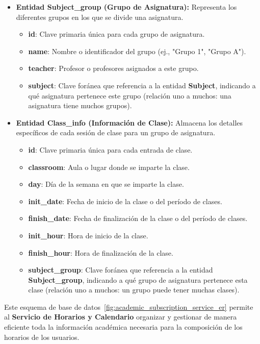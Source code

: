 \begin{itemize}
    \item \textbf{Entidad Subject\_group (Grupo de Asignatura):}
    Representa los diferentes grupos en los que se divide una asignatura.
    \begin{itemize}
        \item \textbf{id}: Clave primaria única para cada grupo de asignatura.
        \item \textbf{name}: Nombre o identificador del grupo (ej., "Grupo 1", "Grupo A").
        \item \textbf{teacher}: Profesor o profesores asignados a este grupo.
        \item \textbf{subject}: Clave foránea que referencia a la entidad \textbf{Subject}, indicando a qué asignatura pertenece este grupo (relación uno a muchos: una asignatura tiene muchos grupos).
    \end{itemize}

    \item \textbf{Entidad Class\_info (Información de Clase):}
    Almacena los detalles específicos de cada sesión de clase para un grupo de asignatura.
    \begin{itemize}
        \item \textbf{id}: Clave primaria única para cada entrada de clase.
        \item \textbf{classroom}: Aula o lugar donde se imparte la clase.
        \item \textbf{day}: Día de la semana en que se imparte la clase.
        \item \textbf{init\_date}: Fecha de inicio de la clase o del período de clases.
        \item \textbf{finish\_date}: Fecha de finalización de la clase o del período de clases.
        \item \textbf{init\_hour}: Hora de inicio de la clase.
        \item \textbf{finish\_hour}: Hora de finalización de la clase.
        \item \textbf{subject\_group}: Clave foránea que referencia a la entidad \textbf{Subject\_group}, indicando a qué grupo de asignatura pertenece esta clase (relación uno a muchos: un grupo puede tener muchas clases).
    \end{itemize}
\end{itemize}

Este esquema de base de datos~\ref{fig:academic_subscription_service_er} permite al \textbf{Servicio de Horarios y Calendario} organizar y gestionar de manera eficiente toda la información académica necesaria para la composición de los horarios de los usuarios.

